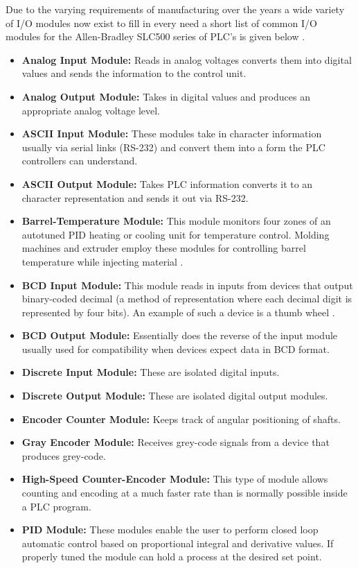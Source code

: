 Due to the varying requirements of manufacturing over the years a wide variety of I/O modules now exist to fill in every need a short list of common I/O modules for the Allen-Bradley SLC500 series of PLC's is given below \cite{slc500}.
\begin{itemize}
	\item \textbf{Analog Input Module:} Reads in analog voltages converts them into digital values and sends the information to the control unit.
	\item \textbf{Analog Output Module:} Takes in digital values and produces an appropriate analog voltage level.
	\item \textbf{ASCII Input Module:} These modules take in character information usually via serial links (RS-232) and convert them into a form the PLC controllers can understand\cite{slc500}.
	\item \textbf{ASCII Output Module:} Takes PLC information converts it to an character representation and sends it out via RS-232.
	\item \textbf{Barrel-Temperature Module:} This module monitors four zones of an autotuned PID heating or cooling unit for temperature control. Molding machines and extruder employ these modules for controlling barrel temperature while injecting material \cite{slc500}.
	\item \textbf{BCD Input Module:} This module reads in inputs from devices that output binary-coded decimal (a method of representation where each decimal digit is represented by four bits). An example of such a device is a thumb wheel \cite{slc500}.
	\item \textbf{BCD Output Module:} Essentially does the reverse of the input module usually used for compatibility when devices expect data in BCD format.
	\item \textbf{Discrete Input Module:} These are isolated digital inputs.
	\item \textbf{Discrete Output Module:} These are isolated digital output modules.
	\item \textbf{Encoder Counter Module:} Keeps track of angular positioning of shafts.
	\item \textbf{Gray Encoder Module:} Receives grey-code signals from a device that produces grey-code.
	\item \textbf{High-Speed Counter-Encoder Module:} This type of module allows counting and encoding at a much faster rate than is normally possible inside a PLC program.
	\item \textbf{PID Module:} These modules enable the user to perform closed loop automatic control based on proportional integral and derivative values. If properly tuned the module can hold a process at the desired set point.

\end{itemize}
